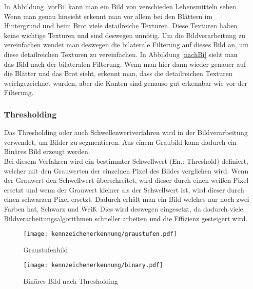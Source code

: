In Abbildung \ref{vorBi} kann man ein Bild von verschieden Lebensmitteln sehen. Wenn man genau hinsieht 
erkennt man vor allem bei den Blättern im Hintergrund und beim Brot viele detailreiche Texturen. 
Diese Texturen haben keine wichtige Texturen und sind deswegen unnötig. Um die Bildverarbeitung zu 
vereinfachen wendet man deswegen die bilaterale Filterung auf dieses Bild an, um diese detailreichen 
Texturen zu vereinfachen. In Abbildung \ref{nachBi} sieht man das Bild nach der bilateralen Filterung. 
Wenn man hier dann wieder genauer auf die Blätter und das Brot sieht, erkennt man, dass die 
detailreichen Texturen weichgezeichnet wurden, aber die Kanten sind genauso gut erkennbar wie vor der Filterung.

\subsubsection{Thresholding}
Das Thresholding oder auch Schwellenwertverfahren wird in der Bildverarbeitung verwendet, um Bilder zu segmentieren. 
Aus einem Graubild kann dadurch ein Binäres Bild erzeugt werden.\\ 

Bei diesem Verfahren wird ein bestimmter Schwellwert (En.: Threshold) definiert, welcher mit den Grauwerten der einzelnen 
Pixel des Bildes verglichen wird. Wenn der Grauwert den Schwellwert überschreitet, wird dieser durch einen weißen Pixel 
ersetzt und wenn der Grauwert kleiner als der Schwellwert ist, wird dieser durch einen schwarzen Pixel ersetzt. 
Dadurch erhält man ein Bild welches nur noch zwei Farben hat, Schwarz und Weiß. Dies wird deswegen eingesetzt, 
da dadurch viele Bildverarbeitungsalgorithmen schneller arbeiten und die Effizienz gesteigert wird.\\

\begin{figure}[htbp]
    \centering
    \begin{minipage}[t]{0.45\linewidth}
        \centering
        \texttt{[image: kennzeichenerkennung/graustufen.pdf]}
        \caption{Graustufenbild}
        \label{graypic}
    \end{minipage}
    \hfill
    \begin{minipage}[t]{0.45\linewidth}
        \centering
        \texttt{[image: kennzeichenerkennung/binary.pdf]}
        \caption{Binäres Bild nach Thresholding}
        \label{binarypic}
    \end{minipage}
\end{figure}

